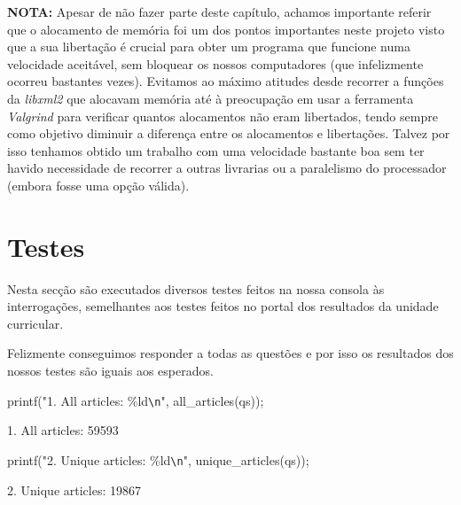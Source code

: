 \documentclass[a4paper,12pt]{report}
\begin{document}
{\bf NOTA:} Apesar de não fazer parte deste capítulo, achamos importante referir que o alocamento de memória foi um dos pontos importantes neste projeto visto que a sua libertação é crucial para obter um programa que funcione numa velocidade aceitável, sem bloquear os nossos computadores (que infelizmente ocorreu bastantes vezes). Evitamos ao máximo atitudes desde recorrer a funções da {\sl libxml2} que alocavam memória até à preocupação em usar a ferramenta {\sl Valgrind} para verificar quantos alocamentos não eram libertados, tendo sempre como objetivo diminuir a diferença entre os alocamentos e libertações. Talvez por isso tenhamos obtido um trabalho com uma velocidade bastante boa sem ter havido necessidade de recorrer a outras livrarias ou a paralelismo do processador (embora fosse uma opção válida).


























\chapter {Testes}

Nesta secção são executados diversos testes feitos na nossa consola às interrogações, semelhantes aos testes feitos no portal dos resultados da unidade curricular. 

Felizmente conseguimos responder a todas as questões e por isso os resultados dos nossos testes são iguais aos esperados.

\begin{tcolorbox}[width=\textwidth,colback={darkgray},title={\sf Excerto 4.1: All Articles.},outer arc=2mm,colupper=white]{\footnotesize\tt

{\color{lightblue}printf}({\color{deadgreen}"1. All articles:} {\color{deadorange}\%ld}{\color{lightblue}\texttt{\textbackslash n}}\color{deadgreen}"\color{white}, {\color{lightblue}all\_articles}(qs)); 

1. All articles: 59593
}
\end{tcolorbox} 

\begin{tcolorbox}[width=\textwidth,colback={darkgray},title={\sf Excerto 4.2: Unique Articles.},outer arc=2mm,colupper=white]{\footnotesize\tt
		
		{\color{lightblue}printf}({\color{deadgreen}"2. Unique articles:} {\color{deadorange}\%ld}{\color{lightblue}\texttt{\textbackslash n}}\color{deadgreen}"\color{white}, {\color{lightblue}unique\_articles}(qs)); 
								
		2. Unique articles: 19867
	}
\end{tcolorbox} 
\end{document}

